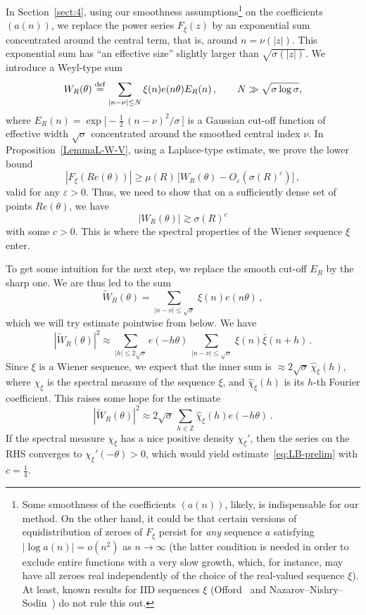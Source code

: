 \documentclass[11pt]{amsart}
\numberwithin{equation}{section}
\def\ep{{\varepsilon}}
\newcommand{\bZ}{\mathbb Z}
\begin{document}
\medskip
In Section~\ref{sect:4}, using our smoothness assumptions\footnote{
Some smoothness of the coefficients $(a(n))$, likely, is
indispensable for our method. On the other hand, it could be that certain versions of
equidistribution of zeroes of $F_\xi$ persist for {\em any} sequence $a$ satisfying
$ |\log a (n) | = o(n^2)$ as $n\to\infty$ (the latter condition is needed in order to exclude
entire functions with a very slow growth, which, for instance, may have all zeroes real independently
of the choice of the real-valued sequence $\xi$). At least, known results for IID sequences $\xi$
(Offord~\cite{Off-Lac1} \cite{Off-Rand2} and Nazarov--Nishry--Sodin~\cite{NNS})
do not rule this out.
}
on the coefficients $(a(n))$,
we replace the power series $F_\xi(z)$ by an exponential sum
concentrated around the central term, that is, around $n=\nu(|z|)$. This exponential sum
has ``an effective size'' slightly larger than $\sqrt{\sigma(|z|)}$. We introduce a
Weyl-type sum
\[
W_R(\theta) \stackrel{\rm def}= \sum_{|n-\nu|\le N}
\xi(n) e(n\theta) E_R(n)\,, \qquad N\gg \sqrt{\sigma\log\sigma},
\]
where
$ E_R(n) = \exp\bigl[ -\tfrac12\, (n-\nu)^2/\sigma\, \bigr] $
is a Gaussian cut-off function of effective width $\sqrt{\sigma}$ concentrated around the smoothed central index $\nu$. In
Proposition~\ref{LemmaL-W-V},
using a Laplace-type estimate, we prove the lower bound
\[
|F_\xi(Re(\theta))| \ge \mu (R)\, \bigl[ W_R(\theta) - O_\ep(\sigma(R)^\ep) \bigr]\,,
\]
valid for any $\ep>0$. Thus, we need to show that on a sufficiently dense set of points
$Re(\theta)$, we have
\begin{equation}\label{eq:LB-prelim}
|W_R(\theta)| \gtrsim \sigma(R)^c
\end{equation}
with some $c>0$. This is where the spectral properties of the Wiener sequence
$\xi$ enter.

\medskip
To get some intuition for the next step, we replace the smooth cut-off $E_R$ by the sharp one.
We are thus led to the sum
\[
\widetilde{W}_R(\theta) = \sum_{|n-\nu|\le\sqrt{\sigma}}\, \xi(n) e(n\theta)\,,
\]
which we will try estimate pointwise from below. We have
\begin{equation}\label{eq:open-brackers}
|\widetilde{W}_R(\theta)|^2 \approx
\sum_{|h|\le 2\sqrt{\sigma}} e(-h\theta)\, \sum_{|n-\nu|\le \sqrt{\sigma}}\, \xi(n)\bar\xi(n+h)\,.
\end{equation}
Since $\xi$ is a Wiener sequence, we expect that the inner sum is $\approx 2\sqrt{\sigma}\, \widehat{\chi}_\xi (h)$, where $\chi_\xi$ is the spectral measure of the sequence $\xi$, and
$\widehat{\chi}_\xi (h)$ is its $h$-th Fourier coefficient.
This raises some hope for the estimate
\[
|\widetilde{W}_R(\theta)|^2 \approx 2\sqrt{\sigma}\, \sum_{h\in\bZ} \widehat{\chi}_\xi (h) e(-h\theta)\,.
\]
If the spectral measure $\chi_\xi$ has a nice positive density $\chi_\xi'$, then the series
on the RHS converges to $\chi_\xi'(-\theta)>0$, which would yield estimate~\eqref{eq:LB-prelim}
with $c=\tfrac14$.
\end{document}
